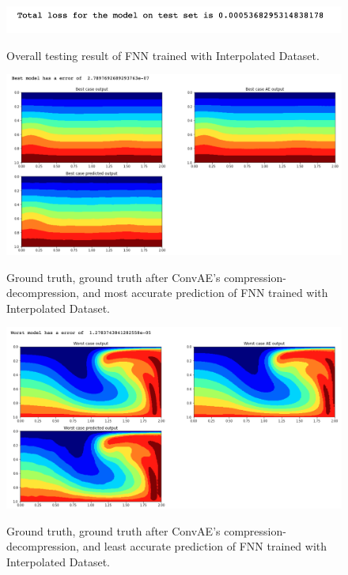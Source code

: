 \begin{figure}[H]
    \caption{Overall testing result of FNN trained with Interpolated Dataset.}
    \includegraphics[scale=0.8]{figures/mantle_convection_images/larger_dataset_interpolated/FNN_OverallTesting.png}
    \label{figure:FNN_interpolated_testing}
\end{figure}

\begin{figure}[H]
    \caption{Ground truth, ground truth after ConvAE's compression-decompression, and most accurate prediction of FNN trained with Interpolated Dataset.}
    \includegraphics[scale=0.5]{figures/mantle_convection_images/larger_dataset_interpolated/FNN_Best.png}
    \label{figure:FNN_interpolated_best}
\end{figure}

\begin{figure}[H]
    \caption{Ground truth, ground truth after ConvAE's compression-decompression, and least accurate prediction of FNN trained with Interpolated Dataset.}
    \includegraphics[scale=0.5]{figures/mantle_convection_images/larger_dataset_interpolated/FNN_Worst.png}
    \label{figure:FNN_interpolated_worst}
\end{figure}

